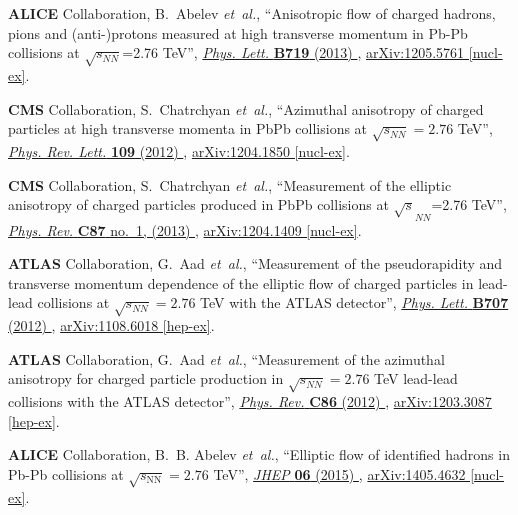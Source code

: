 \documentclass[ALICE,manyauthors]{cernphprep}
\begin{document}
\begin{thebibliography}{10}
{\bfseries ALICE} Collaboration, B.~Abelev {\em et~al.}, ``{Anisotropic flow of
  charged hadrons, pions and (anti-)protons measured at high transverse
  momentum in Pb-Pb collisions at $\sqrt{s_{NN}}$=2.76 TeV}'',
  \href{http://dx.doi.org/10.1016/j.physletb.2012.12.066}{{\em Phys. Lett.}
  {\bfseries B719} (2013) },
\href{http://arxiv.org/abs/1205.5761}{{\ttfamily arXiv:1205.5761 [nucl-ex]}}.

{\bfseries CMS} Collaboration, S.~Chatrchyan {\em et~al.}, ``{Azimuthal
  anisotropy of charged particles at high transverse momenta in PbPb collisions
  at $\sqrt{s_{NN}}=2.76$ TeV}'',
  \href{http://dx.doi.org/10.1103/PhysRevLett.109.022301}{{\em Phys. Rev.
  Lett.} {\bfseries 109} (2012) },
\href{http://arxiv.org/abs/1204.1850}{{\ttfamily arXiv:1204.1850 [nucl-ex]}}.

{\bfseries CMS} Collaboration, S.~Chatrchyan {\em et~al.}, ``{Measurement of
  the elliptic anisotropy of charged particles produced in PbPb collisions at
  $\sqrt{s}_{NN}$=2.76 TeV}'',
  \href{http://dx.doi.org/10.1103/PhysRevC.87.014902}{{\em Phys. Rev.}
  {\bfseries C87} no.~1, (2013) },
\href{http://arxiv.org/abs/1204.1409}{{\ttfamily arXiv:1204.1409 [nucl-ex]}}.

{\bfseries ATLAS} Collaboration, G.~Aad {\em et~al.}, ``{Measurement of the
  pseudorapidity and transverse momentum dependence of the elliptic flow of
  charged particles in lead-lead collisions at $\sqrt{s_{NN}}=2.76$ TeV with
  the ATLAS detector}'',
  \href{http://dx.doi.org/10.1016/j.physletb.2011.12.056}{{\em Phys. Lett.}
  {\bfseries B707} (2012) },
\href{http://arxiv.org/abs/1108.6018}{{\ttfamily arXiv:1108.6018 [hep-ex]}}.

{\bfseries ATLAS} Collaboration, G.~Aad {\em et~al.}, ``{Measurement of the
  azimuthal anisotropy for charged particle production in $\sqrt{s_{NN}}=2.76$
  TeV lead-lead collisions with the ATLAS detector}'',
  \href{http://dx.doi.org/10.1103/PhysRevC.86.014907}{{\em Phys. Rev.}
  {\bfseries C86} (2012) },
\href{http://arxiv.org/abs/1203.3087}{{\ttfamily arXiv:1203.3087 [hep-ex]}}.

{\bfseries ALICE} Collaboration, B.~B. Abelev {\em et~al.}, ``{Elliptic flow of
  identified hadrons in Pb-Pb collisions at $ \sqrt{s_{\mathrm{NN}}}=2.76 $
  TeV}'', \href{http://dx.doi.org/10.1007/JHEP06(2015)190}{{\em JHEP}
  {\bfseries 06} (2015) },
\href{http://arxiv.org/abs/1405.4632}{{\ttfamily arXiv:1405.4632 [nucl-ex]}}.


\end{thebibliography}
\end{document}
